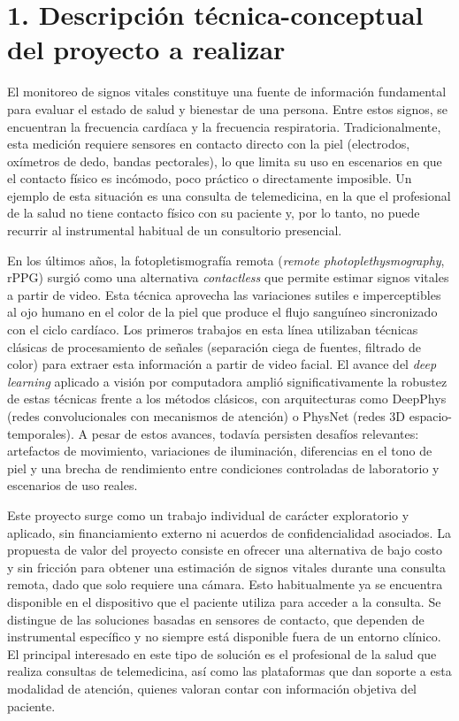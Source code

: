 \documentclass[
11pt, %
]{charter}
\begin{document}
	
	
	
	\section{1. Descripción técnica-conceptual del proyecto a realizar}
	\label{sec:descripcion}
	
	El monitoreo de signos vitales constituye una fuente de información fundamental para evaluar el estado de salud y bienestar de una persona. Entre estos signos, se encuentran la frecuencia cardíaca y la frecuencia respiratoria. Tradicionalmente, esta medición requiere sensores en contacto directo con la piel (electrodos, oxímetros de dedo, bandas pectorales), lo que limita su uso en escenarios en que el contacto físico es incómodo, poco práctico o directamente imposible. Un ejemplo de esta situación es una consulta de telemedicina, en la que el profesional de la salud no tiene contacto físico con su paciente y, por lo tanto, no puede recurrir al instrumental habitual de un consultorio presencial.
	
	En los últimos años, la fotopletismografía remota (\textit{remote photoplethysmography}, rPPG) surgió como una alternativa \textit{contactless} que permite estimar signos vitales a partir de video. Esta técnica aprovecha las variaciones sutiles e imperceptibles al ojo humano en el color de la piel que produce el flujo sanguíneo sincronizado con el ciclo cardíaco. Los primeros trabajos en esta línea utilizaban técnicas clásicas de procesamiento de señales (separación ciega de fuentes, filtrado de color) para extraer esta información a partir de video facial. El avance del \textit{deep learning} aplicado a visión por computadora amplió significativamente la robustez de estas técnicas frente a los métodos clásicos, con arquitecturas como DeepPhys (redes convolucionales con mecanismos de atención) o PhysNet (redes 3D espacio-temporales). A pesar de estos avances, todavía persisten desafíos relevantes: artefactos de movimiento, variaciones de iluminación, diferencias en el tono de piel y una brecha de rendimiento entre condiciones controladas de laboratorio y escenarios de uso reales.
	
	Este proyecto surge como un trabajo individual de carácter exploratorio y aplicado, sin financiamiento externo ni acuerdos de confidencialidad asociados. La propuesta de valor del proyecto consiste en ofrecer una alternativa de bajo costo y sin fricción para obtener una estimación de signos vitales durante una consulta remota, dado que solo requiere una cámara. Esto habitualmente ya se encuentra disponible en el dispositivo que el paciente utiliza para acceder a la consulta. Se distingue de las soluciones basadas en sensores de contacto, que dependen de instrumental específico y no siempre está disponible fuera de un entorno clínico. El principal interesado en este tipo de solución es el profesional de la salud que realiza consultas de telemedicina, así como las plataformas que dan soporte a esta modalidad de atención, quienes valoran contar con información objetiva del paciente.
	
\end{document}

